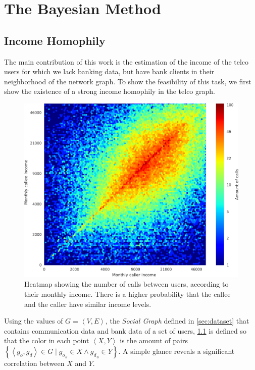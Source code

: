 \chapter{The Bayesian Method}
\label{sec:inference_methodology}

\section{Income Homophily}
\label{subsec:income_homophily}

The main contribution of this work is the estimation of the income of the telco users for which we lack banking data, but have bank clients in their neighborhood of the network graph.
To show the feasibility of this task, we first show the existence of a strong income homophily in the telco graph. 

\begin{figure}
\centering
\includegraphics[width=\textwidth]{figures/Homophily_income_origin_target_1/Homophily_income_origin_target_1.png}
\caption{Heatmap showing the number of calls between users, according to their monthly income. There is a higher probability that the callee and the caller have similar income levels.}
\label{fig:homophily_heatmap}
\end{figure}

Using the values of $G = \left< V, E \right>$, the \emph{Social Graph} defined in \cref{sec:dataset} that contains communication data and bank data of a set of users, \cref{fig:homophily_heatmap} is defined so that the color in each point $\left< X, Y \right>$ is the amount of pairs $\left\{ \left< g_o, g_d \right> \in G \mid {g_o}_s \in X \land {g_d}_s \in Y \right\}$.
A simple glance reveals a significant correlation between $X$ and $Y$.


